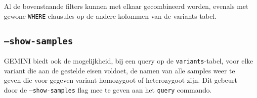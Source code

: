 \noindent Al de bovenstaande filters kunnen met elkaar gecombineerd worden, evenals met gewone \texttt{WHERE}-clausules op de andere kolommen van de variants-tabel.

\subsection{\texttt{--show-samples}}

GEMINI biedt ook de mogelijkheid, bij een query op de \texttt{variants}-tabel, voor elke variant die aan de gestelde eisen voldoet, de namen van alle samples weer te geven die voor gegeven variant homozygoot of heterozygoot zijn. Dit gebeurt door de \texttt{--show-samples} flag mee te geven aan het \texttt{query} commando.



